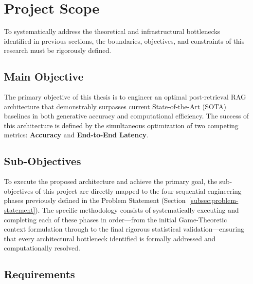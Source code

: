 \section{Project Scope}
\label{sec:project-scope}

To systematically address the theoretical and infrastructural bottlenecks identified in previous sections, the boundaries, objectives, and constraints of this research must be rigorously defined.

\subsection{Main Objective} 
\label{subsec:main-objective}

The primary objective of this thesis is to engineer an optimal post-retrieval RAG architecture that demonstrably surpasses current State-of-the-Art (SOTA) baselines in both generative accuracy and computational efficiency. The success of this architecture is defined by the simultaneous optimization of two competing metrics: \textbf{Accuracy} and \textbf{End-to-End Latency}.

\subsection{Sub-Objectives}
\label{subsec:sub-objectives}

To execute the proposed architecture and achieve the primary goal, the sub-objectives of this project are directly mapped to the four sequential engineering phases previously defined in the Problem Statement (Section~\ref{subsec:problem-statement}). The specific methodology consists of systematically executing and completing each of these phases in order—from the initial Game-Theoretic context formulation through to the final rigorous statistical validation—ensuring that every architectural bottleneck identified is formally addressed and computationally resolved.

\subsection{Requirements}
\label{subsec:requirements}

